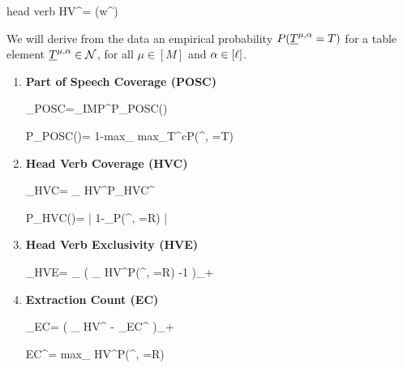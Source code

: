 \documentclass[12pt]{article}
\begin{document}
head verb
\beq
HV^\alp = \indi(w^\alp {})
\eeq

We will
derive from the data an empirical probability $P({\underline{T}}^{\mu, \alpha} =T )$ for a table element
${\underline{T}}^{\mu, \alpha}\in {\cal N}$, for all $\mu\in [M]$ and $\alpha\in[\ell]$.



\begin{enumerate}

\item {\bf Part of Speech Coverage (POSC)}

\beq
\call_{POSC}=\sum_{\alp\in\ell}IMP^{\alp}P_{POSC}(\alp)
\eeq

\beq
P_{POSC}(\alp)=
1-{\rm max}_{\mu\in [M]}
{\rm max}_{T\in \caln^c}P(\rvT^{\mu, \alp}=T)
\eeq

\item {\bf Head Verb Coverage (HVC)}


\beq
\call_{HVC}=
\sum_{\alp\in [\ell]}
HV^\alp P_{HVC}^\alp
\eeq

\beq
P_{HVC}(\alp)=
\left|
1-\sum_{\mu\in [M]}P(\rvT^{\mu, \alp}=R)
\right|
\eeq

\item {\bf Head Verb Exclusivity (HVE)}

\beq
\call_{HVE}=
\sum_{\mu\in [M]}
\left(
\sum_{\alp\in [\ell]}
HV^\alp P(\rvT^{\mu, \alp}=R)
-1
\right)_+
\eeq

\item {\bf Extraction Count (EC)}

\beq
\call_{EC}=
\left(
\sum_{\alp\in[\ell]} HV^\alp
-
\sum_{\mu\in [M]}EC^\mu
\right)_+
\eeq

\beq
EC^\mu=
{\rm max}_{\alp\in [\ell]}
HV^\alp P(\rvT^{\mu, \alp}=R)
\eeq


\end{enumerate}
\end{document}
